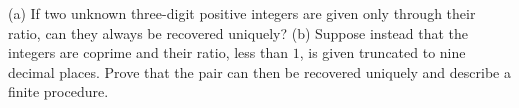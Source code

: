 (a) If two unknown three-digit positive integers are given only through their ratio, can they always be recovered uniquely? (b) Suppose instead that the integers are coprime and their ratio, less than $1$, is given truncated to nine decimal places. Prove that the pair can then be recovered uniquely and describe a finite procedure.
